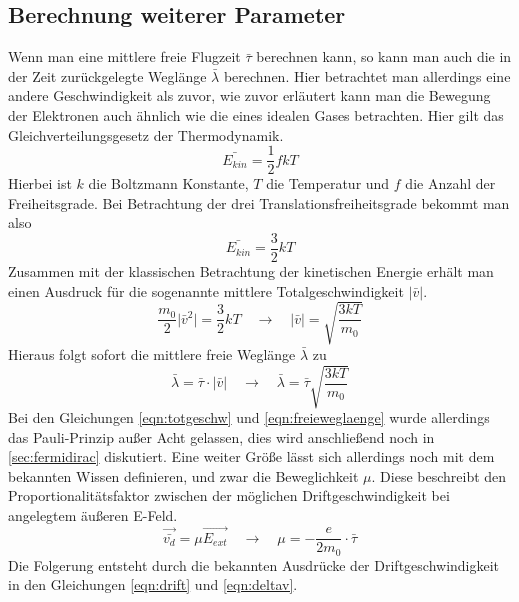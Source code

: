 \subsection{Berechnung weiterer Parameter}
Wenn man eine mittlere freie Flugzeit $\bar{\tau}$ berechnen kann, so kann man auch die in der Zeit zurückgelegte Weglänge $\bar{\lambda}$ berechnen. Hier betrachtet man allerdings
eine andere Geschwindigkeit als zuvor, wie zuvor erläutert kann man die Bewegung der Elektronen auch ähnlich wie die eines idealen Gases betrachten. 
Hier gilt das Gleichverteilungsgesetz der Thermodynamik.
\begin{equation}
\bar{E_{kin}} = \frac{1}{2} f k T
\end{equation}
Hierbei ist $k$ die Boltzmann Konstante, $T$ die Temperatur und $f$ die Anzahl der Freiheitsgrade. Bei Betrachtung der drei Translationsfreiheitsgrade bekommt man also
\begin{equation}
\bar{E_{kin}} = \frac{3}{2} k T
\end{equation}
Zusammen mit der klassischen Betrachtung der kinetischen Energie erhält man einen Ausdruck für die sogenannte mittlere Totalgeschwindigkeit $\lvert \bar{v} \rvert$.
\begin{equation}
\label{eqn:totgeschw}
\frac{m_{0}}{2} \lvert \bar{v}^{2} \rvert = \frac{3}{2} k T \quad \to \quad \lvert \bar{v} \rvert = \sqrt{\frac{3kT}{m_{0}}}
\end{equation}
Hieraus folgt sofort die mittlere freie Weglänge $\bar{\lambda}$ zu
\begin{equation}
\label{eqn:freieweglaenge}
\bar{\lambda} = \bar{\tau} \cdot \lvert \bar{v} \rvert \quad \to \quad \bar{\lambda} = \bar{\tau} \sqrt{\frac{3kT}{m_{0}}}
\end{equation}
Bei den Gleichungen \eqref{eqn:totgeschw} und \eqref{eqn:freieweglaenge} wurde allerdings das Pauli-Prinzip außer Acht gelassen, dies wird anschließend noch in \ref{sec:fermidirac}
diskutiert. Eine weiter Größe lässt sich allerdings noch mit dem bekannten Wissen definieren, und zwar die Beweglichkeit $\mu$. Diese beschreibt den Proportionalitätsfaktor zwischen
der möglichen Driftgeschwindigkeit bei angelegtem äußeren E-Feld.
\begin{equation}
\label{eqn:beweglich}
\vec{\bar{v_{d}}} = \mu \vec{E_{ext}} \quad \to \quad \mu = - \frac{e}{2 m_{0}} \cdot \bar{\tau} 
\end{equation}
Die Folgerung entsteht durch die bekannten Ausdrücke der Driftgeschwindigkeit in den Gleichungen \eqref{eqn:drift} und \eqref{eqn:deltav}.

